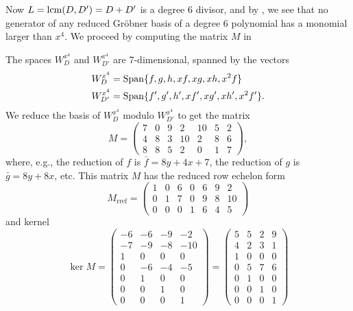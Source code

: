 Now $L = \operatorname{lcm}(D, D') = D + D'$ is a degree 6 divisor, and by ,
we see that no generator of any reduced Gr\"obner basis of a degree 6 polynomial
has a monomial larger than $x^4$.
We proceed by computing the matrix $M$ in
\begin{center}
\end{center}
The spaces $W_D^{x^4}$ and $W_{D'}^{x^4}$ are 7-dimensional, spanned by the vectors
\begin{align*}
  W_D^{x^4} &= \operatorname{Span}\{ f, g, h, xf, xg, xh, x^2f \} \\
  W_{D'}^{x^4} &= \operatorname{Span}\{ f', g', h', xf', xg', xh', x^2f' \}.
\end{align*}
We reduce the basis of $W_D^{x^4}$ modulo $W_{D'}^{x^4}$ to get the matrix
\[ M = \begin{pmatrix}
  7 & 0 & 9 & 2 & 10 & 5 & 2 \\
  4 & 8 & 3 & 10 & 2 & 8 & 6 \\
  8 & 8 & 5 & 2 & 0 & 1 & 7
\end{pmatrix}, \]
where, e.g., the reduction of $f$ is $\bar f = 8y + 4x + 7$,
the reduction of $g$ is $\bar g = 8y + 8x$, etc.
This matrix $M$ has the reduced row echelon form
\[ M_{\text{rref}} = \begin{pmatrix}
  1 & 0 & 6 & 0 & 6 & 9 & 2 \\
  0 & 1 & 7 & 0 & 9 & 8 & 10 \\
  0 & 0 & 0 & 1 & 6 & 4 & 5
\end{pmatrix} \]
and kernel
\[ \ker M =
\begin{pmatrix}
  -6 & -6 & -9 & -2 \\
  -7 & -9 & -8 & -10 \\
   1 &  0 &  0 &  0 \\
   0 & -6 & -4 & -5 \\
   0 &  1 &  0 &  0 \\
   0 &  0 &  1 &  0 \\
   0 &  0 &  0 &  1
\end{pmatrix} =
\begin{pmatrix}
  5 & 5 & 2 & 9 \\
  4 & 2 & 3 & 1 \\
  1 & 0 & 0 & 0 \\
  0 & 5 & 7 & 6 \\
  0 & 1 & 0 & 0 \\
  0 & 0 & 1 & 0 \\
  0 & 0 & 0 & 1
\end{pmatrix} \]
